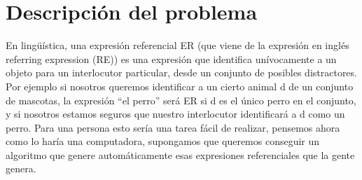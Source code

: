 

\section{Descripci\'on del problema}
\label{sec:intro}

En ling\"u\'{i}stica, una expresi\'on referencial ER (que viene de la expresi\'on en ingl\'es referring expression (RE)) es una expresi\'on que identifica un\'ivocamente a un objeto para un interlocutor particular, desde un conjunto de posibles distractores. Por ejemplo si nosotros queremos identificar a un cierto animal d de un conjunto de mascotas, la expresi\'on ``el perro'' ser\'a ER si d es el \'unico perro en el conjunto, y si nosotros estamos seguros que nuestro interlocutor identificar\'a a d como un perro. Para una persona esto ser\'ia una tarea f\'acil de realizar, pensemos ahora como lo har\'ia una computadora, supongamos que queremos conseguir un algoritmo que genere autom\'aticamente esas expresiones referenciales que la gente genera.\\


